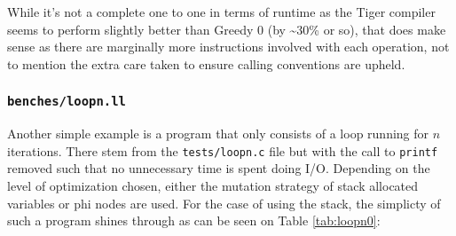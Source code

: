 \documentclass{article}
\begin{document}
\noindent While it's not a complete one to one in terms of runtime as the Tiger compiler seems to perform slightly better than Greedy 0 (by \textasciitilde 30\% or so), that does make sense as there are marginally more instructions involved with each operation, not to mention the extra care taken to ensure calling conventions are upheld.







\subsubsection{\lstinline!benches/loopn.ll!}

Another simple example is a program that only consists of a loop running for \(n\) iterations. There stem from the \texttt{tests/loopn.c} file but with the call to \texttt{printf} removed such that no unnecessary time is spent doing I/O. Depending on the level of optimization chosen, either the mutation strategy of stack allocated variables or phi nodes are used.  For the case of using the stack, the simplicty of such a program shines through as can be seen on Table \ref{tab:loopn0}:
\end{document}
